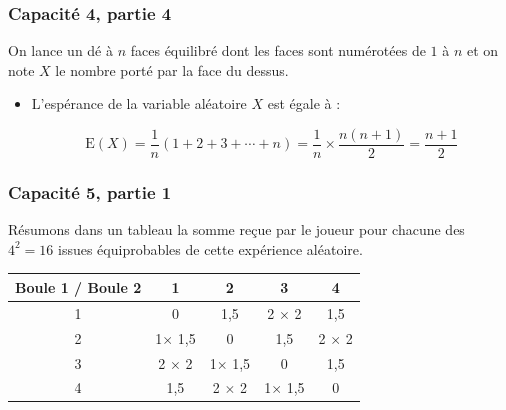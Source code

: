 \documentclass[11pt, hyperref={urlcolor=red,%
            linkcolor=blue, %
            colorlinks=true}]{beamer}
\begin{document}
\begin{frame}
\frametitle{Capacité 4,  partie 4}


On lance un dé à $n$ faces équilibré dont les faces sont numérotées de $1$ à $n$ et on note $X$ le nombre porté par la face du dessus.
	

\begin{itemize}
	\pause \item L'espérance de la variable aléatoire $X$ est égale à  :

$$\text{E}(X)=\frac{1}{n}\left(1+2+3+ \cdots +n\right)=\frac{1}{n}\times \frac{n(n+1)}{2}=\frac{n+1}{2}$$


	
\end{itemize}
	
\end{frame}



\begin{frame}
\label{capacite5}
\frametitle{Capacité 5,  partie 1}

Résumons dans un tableau la somme reçue par le joueur pour chacune des $4^2=16$ issues équiprobables de cette expérience aléatoire.

\begin{tabular}{|c|c|c|c|c|}
\hline 
Boule 1 / Boule 2 & 1 & 2 & 3 & 4 \\ 
\hline 
1 & 0 &  1,5 & 2 $\times$ 2 & 1,5 \\ 
\hline 
2 & 1$\times$ 1,5 & 0 &  1,5 & 2 $\times$ 2 \\ 
\hline 
3 & 2 $\times$ 2 & 1$\times$ 1,5 & 0 & 1,5 \\ 
\hline 
4 & 1,5 & 2 $\times$ 2 & 1$\times$ 1,5 & 0 \\ 
\hline 
\end{tabular} 
	
\end{frame}
\end{document}
